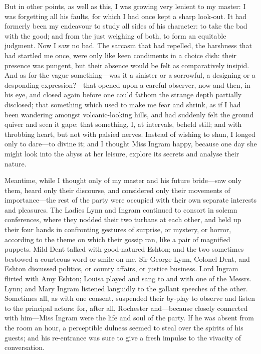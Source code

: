 But in other points, as well as this, I was growing very lenient to my
master: I was forgetting all his faults, for which I had once kept a
sharp look-out. It had formerly been my endeavour to study all sides of
his character: to take the bad with the good; and from the just weighing
of both, to form an equitable judgment. Now I saw no bad. The sarcasm
that had repelled, the harshness that had startled me once, were only
like keen condiments in a choice dish: their presence was pungent, but
their absence would be felt as comparatively insipid. And as for the
vague something---was it a sinister or a sorrowful, a designing or a
desponding expression?---that opened upon a careful observer, now and
then, in his eye, and closed again before one could fathom the strange
depth partially disclosed; that something which used to make me fear and
shrink, as if I had been wandering amongst volcanic-looking hills, and
had suddenly felt the ground quiver and seen it gape: that something, I,
at intervals, beheld still; and with throbbing heart, but not with
palsied nerves. Instead of wishing to shun, I longed only to dare---to
divine it; and I thought Miss Ingram happy, because one day she might
look into the abyss at her leisure, explore its secrets and analyse
their nature.

Meantime, while I thought only of my master and his future bride---saw
only them, heard only their discourse, and considered only their
movements of importance---the rest of the party were occupied with their
own separate interests and pleasures. The Ladies Lynn and Ingram
continued to consort in solemn conferences, where they nodded their two
turbans at each other, and held up their four hands in confronting
gestures of surprise, or mystery, or horror, according to the theme on
which their gossip ran, like a pair of magnified puppets. Mild \Mrs{}
Dent talked with good-natured \Mrs{} Eshton; and the two sometimes
bestowed a courteous word or smile on me. Sir George Lynn, Colonel
Dent, and \Mr{} Eshton discussed politics, or county affairs, or justice
business. Lord Ingram flirted with Amy Eshton; Louisa played and sang
to and with one of the Messrs. Lynn; and Mary Ingram listened languidly
to the gallant speeches of the other. Sometimes all, as with one
consent, suspended their by-play to observe and listen to the principal
actors: for, after all, \Mr{} Rochester and---because closely connected
with him---Miss Ingram were the life and soul of the party. If he was
absent from the room an hour, a perceptible dulness seemed to steal over
the spirits of his guests; and his re-entrance was sure to give a fresh
impulse to the vivacity of conversation.

